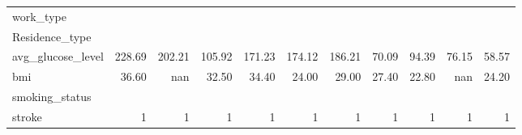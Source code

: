 \begin{table}[H]
\begin{tabular}{@{} l r r r r r r r r r r @{}}
        work_type & \cellcolor{colPrivate}{Private} & \cellcolor{colSelfemployed}{Self-employed} & \cellcolor{colPrivate}{Private} & \cellcolor{colPrivate}{Private} & \cellcolor{colSelfemployed}{Self-employed} & \cellcolor{colPrivate}{Private} & \cellcolor{colPrivate}{Private} & \cellcolor{colPrivate}{Private} & \cellcolor{colPrivate}{Private} & \cellcolor{colPrivate}{Private} \\
        Residence_type & \cellcolor{colUrban}{Urban} & \cellcolor{colRural}{Rural} & \cellcolor{colRural}{Rural} & \cellcolor{colUrban}{Urban} & \cellcolor{colRural}{Rural} & \cellcolor{colUrban}{Urban} & \cellcolor{colRural}{Rural} & \cellcolor{colUrban}{Urban} & \cellcolor{colRural}{Rural} & \cellcolor{colUrban}{Urban} \\
        avg_glucose_level & 228.69 & 202.21 & 105.92 & 171.23 & 174.12 & 186.21 & 70.09 & 94.39 & 76.15 & 58.57 \\
        bmi & 36.60 & nan & 32.50 & 34.40 & 24.00 & 29.00 & 27.40 & 22.80 & nan & 24.20 \\
        smoking_status & \cellcolor{colformerlysmoked}{formerly smoked} & \cellcolor{colneversmoked}{never smoked} & \cellcolor{colneversmoked}{never smoked} & \cellcolor{colsmokes}{smokes} & \cellcolor{colneversmoked}{never smoked} & \cellcolor{colformerlysmoked}{formerly smoked} & \cellcolor{colneversmoked}{never smoked} & \cellcolor{colneversmoked}{never smoked} & \cellcolor{colUnknown}{Unknown} & \cellcolor{colUnknown}{Unknown} \\
        stroke & \cellcolor{boolTrue}1 & \cellcolor{boolTrue}1 & \cellcolor{boolTrue}1 & \cellcolor{boolTrue}1 & \cellcolor{boolTrue}1 & \cellcolor{boolTrue}1 & \cellcolor{boolTrue}1 & \cellcolor{boolTrue}1 & \cellcolor{boolTrue}1 & \cellcolor{boolTrue}1 \\
        \bottomrule
    \end{tabular}
\end{table}
